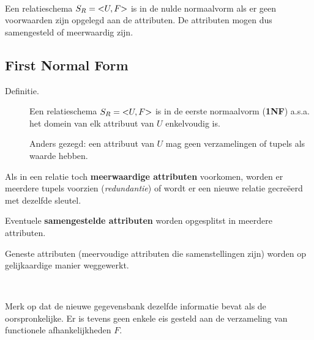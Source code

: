 ~

\noindent Een relatieschema $S_R = \text{\textless} U,F \text{\textgreater}$ is in de nulde normaalvorm als er geen voorwaarden zijn opgelegd aan de attributen. De attributen mogen dus samengesteld of meerwaardig zijn.


\subsection{First Normal Form}
\begin{description}
	\item[Definitie.] Een relatieschema $S_R = \text{\textless} U,F \text{\textgreater}$ is in de eerste normaalvorm (\textbf{1NF}) a.s.a. het domein van elk attribuut van $U$ enkelvoudig is.
	
	Anders gezegd: een attribuut van $U$ mag geen verzamelingen of tupels als waarde hebben.
\end{description}
Als in een relatie toch \textbf{meerwaardige attributen} voorkomen, worden er meerdere tupels voorzien (\textit{redundantie}) of wordt er een nieuwe relatie gecre\"eerd met dezelfde sleutel.

Eventuele \textbf{samengestelde attributen} worden opgesplitst in meerdere attributen.

Geneste attributen (meervoudige attributen die samenstellingen zijn) worden op gelijkaardige manier weggewerkt.

~

\noindent Merk op dat de nieuwe gegevensbank dezelfde informatie bevat als de oorspronkelijke. Er is tevens geen enkele eis gesteld aan de verzameling van functionele afhankelijkheden $F$.


